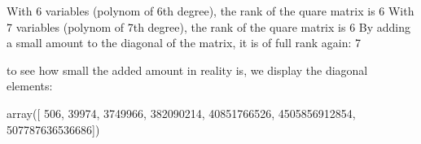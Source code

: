 \documentclass[letterpaper,10pt,english]{jupyterBook}
\begin{document}
\begin{sphinxVerbatim}[commandchars=\\\{\}]
\PYGZbs{}
           
 
\end{sphinxVerbatim}

\begin{sphinxVerbatim}[commandchars=\\\{\}]
With 6 variables (polynom of 6th degree), the rank of the quare matrix
 is 6
With 7 variables (polynom of 7th degree), the rank of the quare matrix
 is 6
By adding a small amount to the diagonal of the matrix, it is of full rank
 again: 7

to see how small the added amount in reality is, we display the diagonal elements:
\end{sphinxVerbatim}

\begin{sphinxVerbatim}[commandchars=\\\{\}]
array([            506,           39974,         3749966,       382090214,
           40851766526,   4505856912854, 507787636536686])
\end{sphinxVerbatim}
\end{document}
